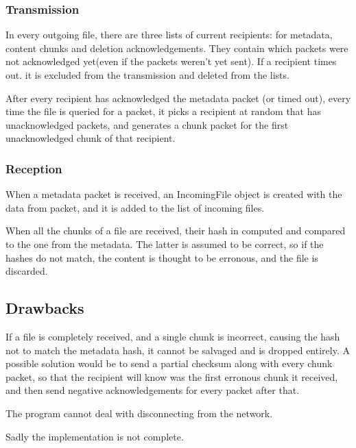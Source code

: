 \documentclass[a4paper, 12pt]{report}
\begin{document}
\subsubsection{Transmission}
In every outgoing file, there are three lists of current recipients: for metadata, content chunks and deletion acknowledgements. They contain which packets were not acknowledged yet(even if the packets weren't yet sent). If a recipient times out. it is excluded from the transmission and deleted from the lists.

After every recipient has acknowledged the metadata packet (or timed out), every time the file is queried for a packet, it picks a recipient at random that has unacknowledged packets, and generates a chunk packet for the first unacknowledged chunk of that recipient.

\subsubsection{Reception}
When a metadata packet is received, an IncomingFile object is created with the data from packet, and it is added to the list of incoming files.

When all the chunks of a file are received, their hash in computed and compared to the one from the metadata. The latter is assumed to be correct, so if the hashes do not match, the content is thought to be erronous, and the file is discarded.

\subsection{Drawbacks}
If a file is completely received, and a single chunk is incorrect, causing the hash not to match the metadata hash, it cannot be salvaged and is dropped entirely. A possible solution would be to send a partial checksum along with every chunk packet, so that the recipient will know was the first erronous chunk it received, and then send negative acknowledgements for every packet after that.

The program cannot deal with disconnecting from the network.

Sadly the implementation is not complete.
\end{document}
